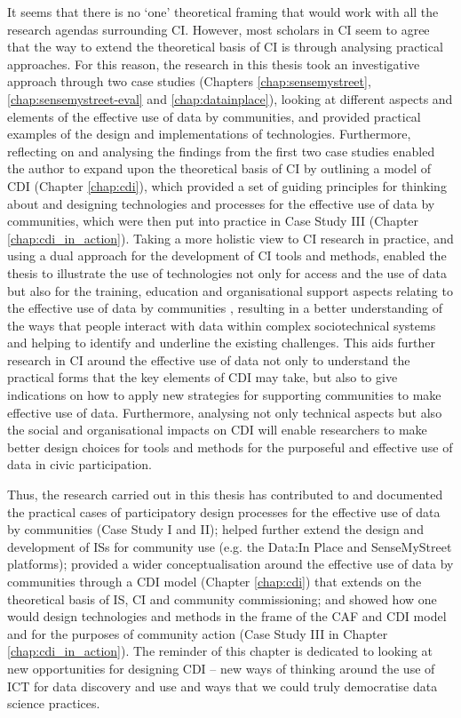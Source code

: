 It seems that there is no `one' theoretical framing that would work with all the research agendas surrounding CI. However, most scholars in CI seem to agree that the way to extend the theoretical basis of CI is through analysing practical approaches. For this reason, the research in this thesis took an investigative approach through two case studies (Chapters \ref{chap:sensemystreet}, \ref{chap:sensemystreet-eval} and \ref{chap:datainplace}), looking at different aspects and elements of the effective use of data by communities, and provided practical examples of the design and implementations of technologies. Furthermore, reflecting on and analysing the findings from the first two case studies enabled the author to expand upon the theoretical basis of CI by outlining a model of CDI (Chapter \ref{chap:cdi}), which provided a set of guiding principles for thinking about and designing technologies and processes for the effective use of data by communities, which were then put into practice in Case Study III (Chapter \ref{chap:cdi_in_action}). Taking a more holistic view to CI research in practice, and using a dual approach for the development of CI tools and methods, enabled the thesis to illustrate the use of technologies not only for access and the use of data but also for the training, education and organisational support aspects relating to the effective use of data by communities \citep{gurstein_effective_2003,gurstein_toward_2012}, resulting in a better understanding of the ways that people interact with data within complex sociotechnical systems and helping to identify and underline the existing challenges. This aids further research in CI around the effective use of data not only to understand the practical forms that the key elements of CDI may take, but also to give indications on how to apply new strategies for supporting communities to make effective use of data. Furthermore, analysing not only technical aspects but also the social and organisational impacts on CDI will enable researchers to make better design choices for tools and methods for the purposeful and effective use of data in civic participation.

Thus, the research carried out in this thesis has contributed to and documented the practical cases of participatory design processes for the effective use of data by communities (Case Study I and II); helped further extend the design and development of ISs for community use (e.g. the Data:In Place and SenseMyStreet platforms); provided a wider conceptualisation around the effective use of data by communities through a CDI model (Chapter \ref{chap:cdi}) that extends on the theoretical basis of IS, CI and community commissioning; and showed how one would design technologies and methods in the frame of the CAF and CDI model and for the purposes of community action (Case Study III in Chapter \ref{chap:cdi_in_action}). The reminder of this chapter is dedicated to looking at new opportunities for designing CDI -- new ways of thinking around the use of ICT for data discovery and use and ways that we could truly democratise data science practices.

